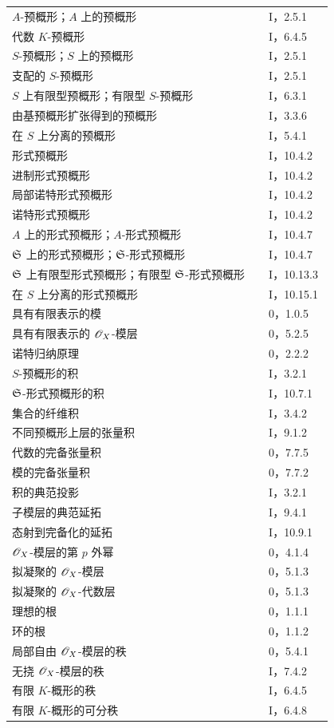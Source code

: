 \begin{longtable}{@{}p{0.76\linewidth}p{0.19\linewidth}@{}}
$A$-预概形；$A$ 上的预概形&I，2.5.1\\
代数 $K$-预概形&I，6.4.5\\
$S$-预概形；$S$ 上的预概形&I，2.5.1\\
支配的 $S$-预概形&I，2.5.1\\
$S$ 上有限型预概形；有限型 $S$-预概形&I，6.3.1\\
由基预概形扩张得到的预概形&I，3.3.6\\
在 $S$ 上分离的预概形&I，5.4.1\\
形式预概形&I，10.4.2\\
进制形式预概形&I，10.4.2\\
局部诺特形式预概形&I，10.4.2\\
诺特形式预概形&I，10.4.2\\
$A$ 上的形式预概形；$A$-形式预概形&I，10.4.7\\
$\mathfrak S$ 上的形式预概形；$\mathfrak S$-形式预概形&I，10.4.7\\
$\mathfrak S$ 上有限型形式预概形；有限型 $\mathfrak S$-形式预概形&I，10.13.3\\
在 $S$ 上分离的形式预概形&I，10.15.1\\
具有有限表示的模&0，1.0.5\\
具有有限表示的 $\mathscr O_X$-模层&0，5.2.5\\
诺特归纳原理&0，2.2.2\\
$S$-预概形的积&I，3.2.1\\
$\mathfrak S$-形式预概形的积&I，10.7.1\\
集合的纤维积&I，3.4.2\\
不同预概形上层的张量积&I，9.1.2\\
代数的完备张量积&0，7.7.5\\
模的完备张量积&0，7.7.2\\
积的典范投影&I，3.2.1\\
子模层的典范延拓&I，9.4.1\\
态射到完备化的延拓&I，10.9.1\\
$\mathscr O_X$-模层的第 $p$ 外幂&0，4.1.4\\
拟凝聚的 $\mathscr O_X$-模层&0，5.1.3\\
拟凝聚的 $\mathscr O_X$-代数层&0，5.1.3\\
理想的根&0，1.1.1\\
环的根&0，1.1.2\\
局部自由 $\mathscr O_X$-模层的秩&0，5.4.1\\
无挠 $\mathscr O_X$-模层的秩&I，7.4.2\\
有限 $K$-概形的秩&I，6.4.5\\
有限 $K$-概形的可分秩&I，6.4.8\\

\end{longtable}
